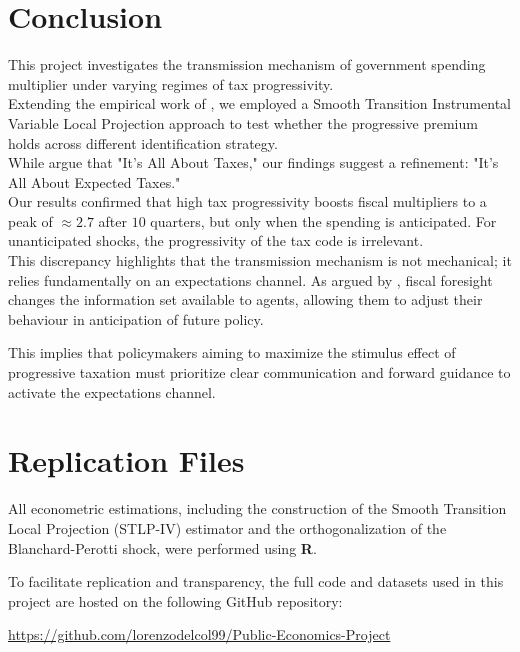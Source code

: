 \documentclass[12pt,letterpaper]{article}
\begin{document}
\section{Conclusion}
This project investigates the transmission mechanism of government spending multiplier under varying regimes of tax progressivity.
\\
Extending the empirical work of \cite{FN}, we employed a Smooth Transition Instrumental Variable Local Projection approach to test whether the progressive premium holds across different identification strategy.
\\
While \cite{FN} argue that "It's All About Taxes," our findings suggest a refinement: "It's All About Expected Taxes." 
\\
Our results confirmed that high tax progressivity boosts fiscal multipliers to a peak of $\approx 2.7$ after $10$ quarters, but only when the spending is anticipated. For unanticipated shocks, the progressivity of the tax code is irrelevant. 
\\
This discrepancy highlights that the transmission mechanism is not mechanical; it relies fundamentally on an expectations channel. As argued by \cite{Ascari}, fiscal foresight changes the information set available to agents, allowing them to adjust their behaviour in anticipation of future policy.

This implies that policymakers aiming to maximize the stimulus effect of progressive taxation must prioritize clear communication and forward guidance to activate the expectations channel.


\clearpage



\section{Replication Files}
\label{app:code}

All econometric estimations, including the construction of the Smooth Transition Local Projection (STLP-IV) estimator and the orthogonalization of the Blanchard-Perotti shock, were performed using \textbf{R}.

To facilitate replication and transparency, the full code and datasets used in this project are hosted on the following GitHub repository:

\begin{center}
    \url{https://github.com/lorenzodelcol99/Public-Economics-Project}
\end{center}
\end{document}
